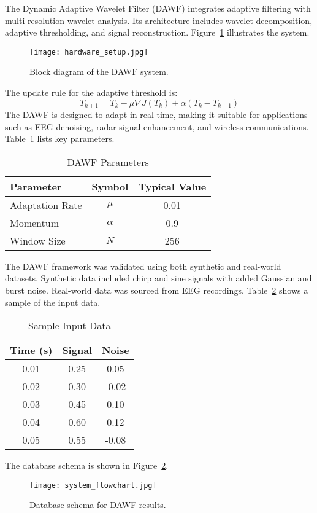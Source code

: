 \documentclass{article}
\begin{document}
The Dynamic Adaptive Wavelet Filter (DAWF) integrates adaptive filtering with multi-resolution wavelet analysis. Its architecture includes wavelet decomposition, adaptive thresholding, and signal reconstruction. Figure~\ref{fig:dawf_arch} illustrates the system.
\begin{figure}[h!]
\centering
\texttt{[image: hardware\_setup.jpg]}
\caption{Block diagram of the DAWF system.}
\label{fig:dawf_arch}
\end{figure}
The update rule for the adaptive threshold is:
\begin{equation}
T_{k+1} = T_k - \mu \nabla J(T_k) + \alpha(T_k - T_{k-1})
\end{equation}
The DAWF is designed to adapt in real time, making it suitable for applications such as EEG denoising, radar signal enhancement, and wireless communications. Table~\ref{tab:dawf_params} lists key parameters.
\begin{table}[h!]
\centering
\caption{DAWF Parameters}
\begin{tabular}{|l|c|c|}
\hline
Parameter & Symbol & Typical Value \\
\hline
Adaptation Rate & $\mu$ & 0.01 \\
Momentum & $\alpha$ & 0.9 \\
Window Size & $N$ & 256 \\
\hline
\end{tabular}
\label{tab:dawf_params}
\end{table}

The DAWF framework was validated using both synthetic and real-world datasets. Synthetic data included chirp and sine signals with added Gaussian and burst noise. Real-world data was sourced from EEG recordings. Table~\ref{tab:input_data} shows a sample of the input data.
\begin{table}[h!]
\centering
\caption{Sample Input Data}
\begin{tabular}{|c|c|c|}
\hline
Time (s) & Signal & Noise \\
\hline
0.01 & 0.25 & 0.05 \\
0.02 & 0.30 & -0.02 \\
0.03 & 0.45 & 0.10 \\
0.04 & 0.60 & 0.12 \\
0.05 & 0.55 & -0.08 \\
\hline
\end{tabular}
\label{tab:input_data}
\end{table}
The database schema is shown in Figure~\ref{fig:db_schema}.
\begin{figure}[h!]
\centering
\texttt{[image: system\_flowchart.jpg]}
\caption{Database schema for DAWF results.}
\label{fig:db_schema}
\end{figure}
\end{document}
